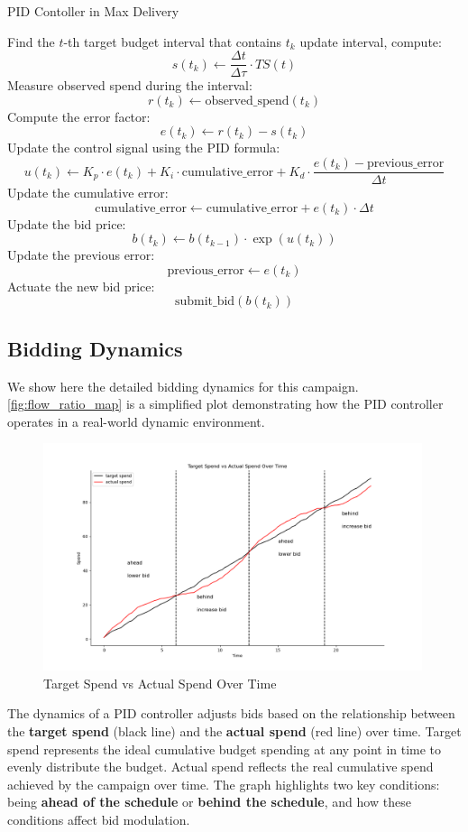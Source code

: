 \documentclass[../main.tex]{subfiles}
\begin{document}
\begin{section}{PID Contoller in Max Delivery}
\begin{algorithm}
\begin{algorithmic}[1]
				 
				\State Find the $t$-th target budget interval that contains $t_k$ update interval, compute:
				\[
				s(t_k) \gets \frac{\Delta t}{\Delta\tau} \cdot TS(t)
				\]
				\State Measure observed spend during the interval:
				\[
				r(t_k) \gets \text{observed\_spend}(t_k)
				\]
				\State Compute the error factor:
				\[
				e(t_k) \gets r(t_k) - s(t_k)
				\]
				\State Update the control signal using the PID formula:
				\[
				u(t_k) \gets K_p \cdot e(t_k) + K_i \cdot \text{cumulative\_error} + K_d \cdot \frac{e(t_k) - \text{previous\_error}}{\Delta t}
				\]
				\State Update the cumulative error:
				\[
				\text{cumulative\_error} \gets \text{cumulative\_error} + e(t_k) \cdot \Delta t
				\]
				\State Update the bid price:
				\[
				b(t_k) \gets b(t_{k-1}) \cdot \exp(u(t_k))
				\]
				\State Update the previous error:
				\[
				\text{previous\_error} \gets e(t_k)
				\]
				\State Actuate the new bid price:
				\[
				\text{submit\_bid}(b(t_k))
				\]
				\EndFor
			\end{algorithmic}
		\end{algorithm}
		
		\subsection*{Bidding Dynamics}
		We show here the detailed bidding dynamics for this campaign. \autoref{fig:flow_ratio_map} is a simplified plot demonstrating how the PID controller operates in a real-world dynamic environment. 
		\begin{figure}[H]
			\centering
			\includegraphics[width=0.99\textwidth]{../Images/flow_ratio_map.png}
			\caption{Target Spend vs Actual Spend Over Time}
			\label{fig:flow_ratio_map}
		\end{figure}
	The dynamics of a PID controller adjusts bids based on the relationship between the \textbf{target spend} (black line) and the \textbf{actual spend} (red line) over time. Target spend represents the ideal cumulative budget spending at any point in time to evenly distribute the budget. Actual spend reflects the real cumulative spend achieved by the campaign over time.  The graph highlights two key conditions: being \textbf{ahead of the schedule} or \textbf{behind the schedule}, and how these conditions affect bid modulation.
	

\end{section}
\end{document}

